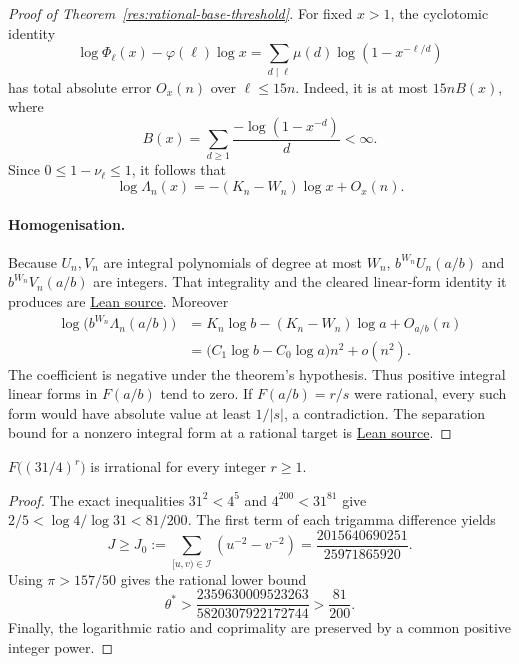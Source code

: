 \documentclass[11pt]{article}
\begin{document}
\begin{proof}[Proof of Theorem~\ref{res:rational-base-threshold}]
For fixed $x>1$, the cyclotomic identity
\[
 \log\Phi_\ell(x)-\varphi(\ell)\log x
 =\sum_{d\mid\ell}\mu(d)\log(1-x^{-\ell/d})
\]
has total absolute error $O_x(n)$ over $\ell\le15n$.
Indeed, it is at most $15n B(x)$, where
\[
 B(x)=\sum_{d\ge1}\frac{-\log(1-x^{-d})}{d}<\infty.
\]
Since $0\le1-\nu_\ell\le1$, it follows that
\[
 \log\Lambda_n(x)=-(K_n-W_n)\log x+O_x(n).
\]

\paragraph{Homogenisation.}
Because $U_n,V_n$ are integral polynomials of degree at most $W_n$,
$b^{W_n}U_n(a/b)$ and $b^{W_n}V_n(a/b)$ are integers.
That integrality and the cleared linear-form identity it produces are
\href{https://github.com/wcook04/plectis-erdos/blob/f36a98bf3d3e6f65f1074e3b800e3293d5b8a51a/ErdosProblems/Erdos1049/PaperHomogenisationR7.lean#L61}{Lean source}.
Moreover
\[
\begin{split}
 \log\bigl(b^{W_n}\Lambda_n(a/b)\bigr)
 &=K_n\log b-(K_n-W_n)\log a+O_{a/b}(n)\\
 &=\bigl(C_1\log b-C_0\log a\bigr)n^2+o(n^2).
\end{split}
\]
The coefficient is negative under the theorem's hypothesis.  Thus positive
integral linear forms in $F(a/b)$ tend to zero.  If $F(a/b)=r/s$ were rational,
every such form would have absolute value at least $1/|s|$, a contradiction.
The separation bound for a nonzero integral form at a rational target is
\href{https://github.com/wcook04/plectis-erdos/blob/f36a98bf3d3e6f65f1074e3b800e3293d5b8a51a/ErdosProblems/Erdos1049/TwoSelectorRemainderEscape.lean#L128}{Lean source}.
\end{proof}

\begin{corollary}\label{res:thirtyone-four}
$F\bigl((31/4)^r\bigr)$ is irrational for every integer $r\ge1$.
\end{corollary}
\begin{proof}
The exact inequalities $31^2<4^5$ and $4^{200}<31^{81}$ give
$2/5<\log4/\log31<81/200$.
The first term of each trigamma difference yields
\[
 J\ge J_0:=\sum_{[u,v)\in\mathcal I}(u^{-2}-v^{-2})
   =\frac{2015640690251}{25971865920}.
\]
Using $\pi>157/50$ gives the rational lower bound
\[
 \theta^*>\frac{2359630009523263}{5820307922172744}
           >\frac{81}{200}.
\]
Finally, the logarithmic ratio and coprimality are preserved by a common
positive integer power.
\end{proof}
\end{document}
